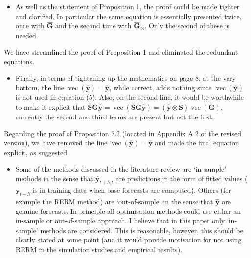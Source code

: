 \documentclass[11pt,a4paper,]{article}
\providecommand{\tightlist}{%
  \setlength{\itemsep}{0pt}\setlength{\parskip}{0pt}}
\renewenvironment{quote}
               {\list{}{\rightmargin\leftmargin}%
                \item\relax\color[RGB]{0,150,0}}
               {\endlist}
\begin{document}
\begin{itemize}
\tightlist
\item
  As well as the statement of Proposition 1, the proof could be made
  tighter and clarified. In particular the same equation is essentially
  presented twice, once with \(\hat{\bm{G}}\) and the second time with
  \(\hat{\bm{G}}_{\cdot \mathbb{S}}\). Only the second of these is
  needed.
\end{itemize}

\begin{quote}
We have streamlined the proof of Proposition 1 and eliminated the
redundant equations.
\end{quote}

\begin{itemize}
\tightlist
\item
  Finally, in terms of tightening up the mathematics on page 8, at the
  very bottom, the line
  \(\operatorname{vec}(\hat{\bm{y}})=\hat{\bm{y}}\), while correct, adds
  nothing since \(\operatorname{vec}(\hat{\bm{y}})\) is not used in
  equation (5). Also, on the second line, it would be worthwhile to make
  it explicit that
  \(\bm{SG}\hat{\bm{y}}=\operatorname{vec}(\bm{SG}\hat{\bm{y}})=(\hat{\bm{y}} \otimes \bm{S}) \operatorname{vec}(\bm{G})\),
  currently the second and third terms are present but not the first.
\end{itemize}

\begin{quote}
Regarding the proof of Proposition 3.2 (located in Appendix A.2 of the
revised version), we have removed the line
\(\operatorname{vec}(\hat{\bm{y}})=\hat{\bm{y}}\) and made the final
equation explicit, as suggested.
\end{quote}

\begin{itemize}
\tightlist
\item
  Some of the methods discussed in the literature review are `in-sample'
  methods in the sense that \(\hat{\bm{y}}_{t+h|t}\) are predictions in
  the form of fitted values (\(\bm{y}_{t+h}\) is in training data when
  base forecasts are computed). Others (for example the RERM method) are
  `out-of-sample' in the sense that \(\hat{\bm{y}}\) are genuine
  forecasts. In principle all optimisation methods could use either an
  in-sample or out-of-sample approach. I believe that in this paper only
  `in-sample' methods are considered. This is reasonable, however, this
  should be clearly stated at some point (and it would provide
  motivation for not using RERM in the simulation studies and empirical
  results).
\end{itemize}
\end{document}
